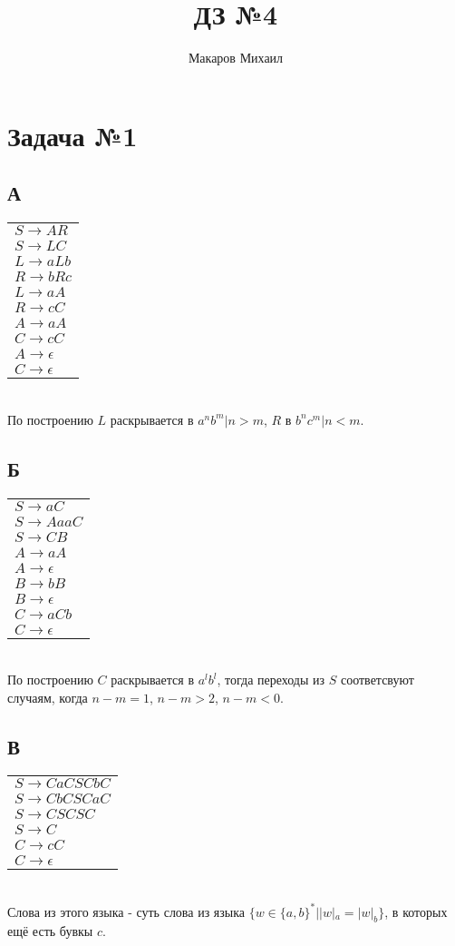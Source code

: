 \documentclass{article}
\title{ДЗ №4}
\author{Макаров Михаил}
\date{}
\begin{document}
	\maketitle

    \section{Задача №1}
    \subsection{А}
    \begin{tabular}{l}
    $ S \to AR $\\
    $ S \to LC $\\
    $ L \to aLb $\\
    $ R \to bRc $\\
    $ L \to aA $\\
    $ R \to cC $\\
    $ A \to aA $\\
    $ C \to cC $\\
    $ A \to \epsilon$\\
    $ C \to \epsilon$\\
    \end{tabular}\\
    По построению $L$ раскрывается в $a^nb^m|n > m$, $R$ в $b^nc^m|n < m$.
    \subsection{Б}
    \begin{tabular}{l}
    $ S \to aC $\\
    $ S \to AaaC$\\
    $ S \to CB$\\
    $ A \to aA$\\
    $ A \to \epsilon$\\
    $ B \to bB$\\
    $ B \to \epsilon$\\
    $ C \to aCb $\\
    $ C \to \epsilon$\\
    \end{tabular}\\
    По построению $C$ раскрывается в $a^lb^l$, тогда переходы из $S$ соответсвуют случаям, когда 
    $n - m = 1$, $n - m > 2$, $n - m < 0$.
    \subsection{В}
    \begin{tabular}{l}
    $ S \to CaCSCbC $\\
    $ S \to CbCSCaC$\\
    $ S \to CSCSC$\\
    $ S \to C$\\
    $ C \to cC $\\
    $ C \to \epsilon$\\
    \end{tabular}\\
    Слова из этого языка - суть слова из языка $\{ w \in \{a, b\}^* | |w|_a = |w|_b \} $, в которых ещё есть бувкы $c$.
\end{document}
